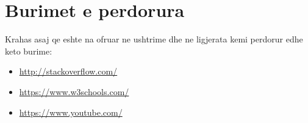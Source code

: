 \documentclass[]{article}
\begin{document}
\section{Burimet e perdorura}
Krahas asaj qe eshte na ofruar ne ushtrime dhe ne ligjerata kemi perdorur edhe keto burime:
\begin{itemize}
\item \url{http://stackoverflow.com/}
\item \url{https://www.w3schools.com/}
\item \url{https://www.youtube.com/}

\end{itemize}
\end{document}
